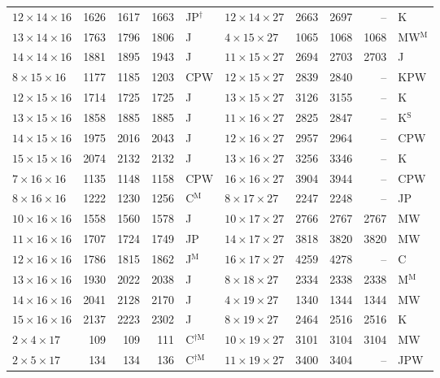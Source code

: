 \begin{longtable}{@{}lrrrl@{\hspace{6mm}}lrrrl@{}}
$12{\times}14{\times}16$ & 1626 & 1617 & 1663 & JP$^{\dagger}$ & $12{\times}14{\times}27$ & 2663 & 2697 & -- & K\\
$13{\times}14{\times}16$ & 1763 & 1796 & 1806 & J & $4{\times}15{\times}27$ & 1065 & 1068 & 1068 & MW$^{\mathrm{M}}$\\
$14{\times}14{\times}16$ & 1881 & 1895 & 1943 & J & $11{\times}15{\times}27$ & 2694 & 2703 & 2703 & J\\
$8{\times}15{\times}16$ & 1177 & 1185 & 1203 & CPW & $12{\times}15{\times}27$ & 2839 & 2840 & -- & KPW\\
$12{\times}15{\times}16$ & 1714 & 1725 & 1725 & J & $13{\times}15{\times}27$ & 3126 & 3155 & -- & K\\
$13{\times}15{\times}16$ & 1858 & 1885 & 1885 & J & $11{\times}16{\times}27$ & 2825 & 2847 & -- & K$^{\mathrm{S}}$\\
$14{\times}15{\times}16$ & 1975 & 2016 & 2043 & J & $12{\times}16{\times}27$ & 2957 & 2964 & -- & CPW\\
$15{\times}15{\times}16$ & 2074 & 2132 & 2132 & J & $13{\times}16{\times}27$ & 3256 & 3346 & -- & K\\
$7{\times}16{\times}16$ & 1135 & 1148 & 1158 & CPW & $16{\times}16{\times}27$ & 3904 & 3944 & -- & CPW\\
$8{\times}16{\times}16$ & 1222 & 1230 & 1256 & C$^{\mathrm{M}}$ & $8{\times}17{\times}27$ & 2247 & 2248 & -- & JP\\
$10{\times}16{\times}16$ & 1558 & 1560 & 1578 & J & $10{\times}17{\times}27$ & 2766 & 2767 & 2767 & MW\\
$11{\times}16{\times}16$ & 1707 & 1724 & 1749 & JP & $14{\times}17{\times}27$ & 3818 & 3820 & 3820 & MW\\
$12{\times}16{\times}16$ & 1786 & 1815 & 1862 & J$^{\mathrm{M}}$ & $16{\times}17{\times}27$ & 4259 & 4278 & -- & C\\
$13{\times}16{\times}16$ & 1930 & 2022 & 2038 & J & $8{\times}18{\times}27$ & 2334 & 2338 & 2338 & M$^{\mathrm{M}}$\\
$14{\times}16{\times}16$ & 2041 & 2128 & 2170 & J & $4{\times}19{\times}27$ & 1340 & 1344 & 1344 & MW\\
$15{\times}16{\times}16$ & 2137 & 2223 & 2302 & J & $8{\times}19{\times}27$ & 2464 & 2516 & 2516 & K\\
$2{\times}4{\times}17$ & 109 & 109 & 111 & C$^{\dagger\mathrm{M}}$ & $10{\times}19{\times}27$ & 3101 & 3104 & 3104 & MW\\
$2{\times}5{\times}17$ & 134 & 134 & 136 & C$^{\dagger\mathrm{M}}$ & $11{\times}19{\times}27$ & 3400 & 3404 & -- & JPW\\

\end{longtable}
